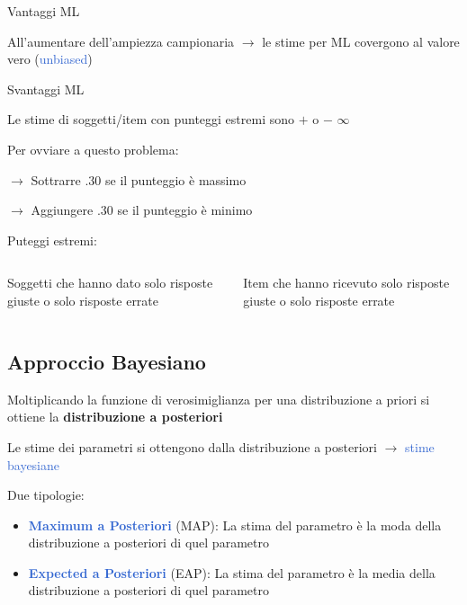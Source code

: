 \documentclass[
  ignorenonframetext,
]{beamer}
\begin{document}
\begin{frame}{}
\protect\hypertarget{section-5}{}
\begin{exampleblock}{Vantaggi ML}

\vspace{3mm}
All'aumentare dell'ampiezza campionaria $\rightarrow$ le stime per ML covergono al valore vero (\textcolor{highlight}{unbiased})

\end{exampleblock}

\begin{alertblock}{Svantaggi ML}

\vspace{3mm}
Le stime di soggetti/item con punteggi estremi sono $+$ o $-$ $\infty$

Per ovviare a questo problema: 

$\rightarrow$ Sottrarre $.30$ se il punteggio è massimo

$\rightarrow$ Aggiungere $.30$ se il punteggio è minimo

\end{alertblock}

\begin{center}
Puteggi estremi:
\end{center}

\begin{columns}[T]
\begin{column}{0.48\textwidth}
Soggetti che hanno dato solo risposte giuste o solo risposte errate
\end{column}

\begin{column}{0.48\textwidth}
Item che hanno ricevuto solo risposte giuste o solo risposte errate
\end{column}
\end{columns}
\end{frame}

\hypertarget{approccio-bayesiano}{%
\subsection{Approccio Bayesiano}\label{approccio-bayesiano}}

\begin{frame}{}
\protect\hypertarget{section-6}{}
Moltiplicando la funzione di verosimiglianza per una distribuzione a
priori si ottiene la \textbf{distribuzione a posteriori}

Le stime dei parametri si ottengono dalla distribuzione a posteriori
\(\rightarrow\) \textcolor{highlight}{stime bayesiane}

Due tipologie:

\begin{itemize}
\item
  \textcolor{highlight}{\textbf{Maximum a Posteriori}} (MAP): La stima
  del parametro è la moda della distribuzione a posteriori di quel
  parametro
\item
  \textcolor{highlight}{\textbf{Expected a Posteriori}} (EAP): La stima
  del parametro è la media della distribuzione a posteriori di quel
  parametro
\end{itemize}
\end{frame}
\end{document}
